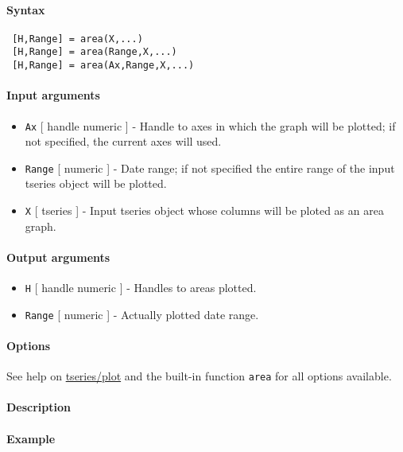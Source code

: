 


	\paragraph{Syntax}
 
 \begin{verbatim}
 [H,Range] = area(X,...)
 [H,Range] = area(Range,X,...)
 [H,Range] = area(Ax,Range,X,...)
 \end{verbatim}
 
 \paragraph{Input arguments}
 
 \begin{itemize}
 \item
   \texttt{Ax} {[} handle \textbar{} numeric {]} - Handle to axes in
   which the graph will be plotted; if not specified, the current axes
   will used.
 \item
   \texttt{Range} {[} numeric {]} - Date range; if not specified the
   entire range of the input tseries object will be plotted.
 \item
   \texttt{X} {[} tseries {]} - Input tseries object whose columns will
   be ploted as an area graph.
 \end{itemize}
 
 \paragraph{Output arguments}
 
 \begin{itemize}
 \item
   \texttt{H} {[} handle \textbar{} numeric {]} - Handles to areas
   plotted.
 \item
   \texttt{Range} {[} numeric {]} - Actually plotted date range.
 \end{itemize}
 
 \paragraph{Options}
 
 See help on \url{tseries/plot} and the built-in function \texttt{area}
 for all options available.
 
 \paragraph{Description}
 
 \paragraph{Example}


